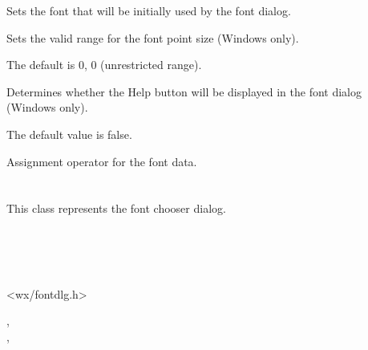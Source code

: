 \label{wxfontdatasetinitialfont}


Sets the font that will be initially used by the font dialog.

\label{wxfontdatasetrange}


Sets the valid range for the font point size (Windows only).

The default is 0, 0 (unrestricted range).

\label{wxfontdatasetshowhelp}


Determines whether the Help button will be displayed in the font dialog (Windows only).

The default value is false.

\label{wxfontdataassign}


Assignment operator for the font data.

\section{}\label{wxfontdialog}

This class represents the font chooser dialog.


\\
\\
\\


<wx/fontdlg.h>


,\\
,\\


